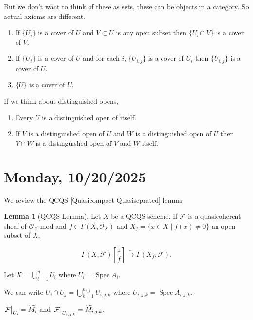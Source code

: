 \documentclass{article}
\theoremstyle{definition}
\newtheorem{lemma}[theorem]{Lemma}
\begin{document}
    But we don't want to think of these as sets, these can be objects in a category. So actual axioms are different.

    \begin{enumerate}[label=\arabic*)]
        \item If \(\{ U_i \} \) is a cover of \(U\) and \(V \subset U\) is any open subset then \(\{ U_i\cap V \} \) is a cover of \(V\). 
        \item If \(\{ U_i \} \) is a cover of \(U\) and for each \(i\), \(\{ U_{i,j} \} \) is a cover of \(U_i\) then \(\{ U_{i,j}  \} \) is a cover of \(U\).
        \item \(\{ U \}\) is a cover of \(U\). 
    \end{enumerate} 

    If we think about distinguished opens,

    \begin{enumerate}[label=\alph*)]
        \item Every \(U\) is a distinguished open of itself.
        \item If \(V\) is a distinguished open of \(U\) and \(W\) is a distinguished open of \(U\) then \(V \cap W\) is a distinguished open of \(V\) and \(W\) itself. 
    \end{enumerate} 

    \section*{Monday, 10/20/2025}
    
    We review the QCQS [Quasicompact Quasiseprated] lemma
    
    \begin{lemma}
        [QCQS Lemma] Let \(X\) be a QCQS scheme. If \(\mathcal{F}\) is a quasicoherent sheaf of \(\mathcal{O}_X\)-mod and \(f\in \Gamma(X, \mathcal{O}_X)\) and \(X_f = \{ x\in X \mid f(x)\neq 0 \} \) an open subset of \(X\),

        \[
            \Gamma(X, \mathcal{F}) \left[ \frac{1}{f} \right] \xrightarrow{\sim} \Gamma(X_{f}, \mathcal{F}).
        \]
    \end{lemma}

    Let \(X = \bigcup_{i=1}^n U_i\) where \(U_i = \operatorname{Spec} A_i\).

    We can write \(U_i \cap U_j = \bigcup_{k=1}^{n_{i,j}} U_{i,j,k}\) where \(U_{i,j,k} = \operatorname{Spec} A_{i,j,k}\).

    \(\eval{\mathcal{F}}_{U_i} = \widetilde{M}_i\) and \(\eval{\mathcal{F}}_{U_{i,j,k}} = \widetilde{M}_{i,j,k}\).
        
\end{document}
